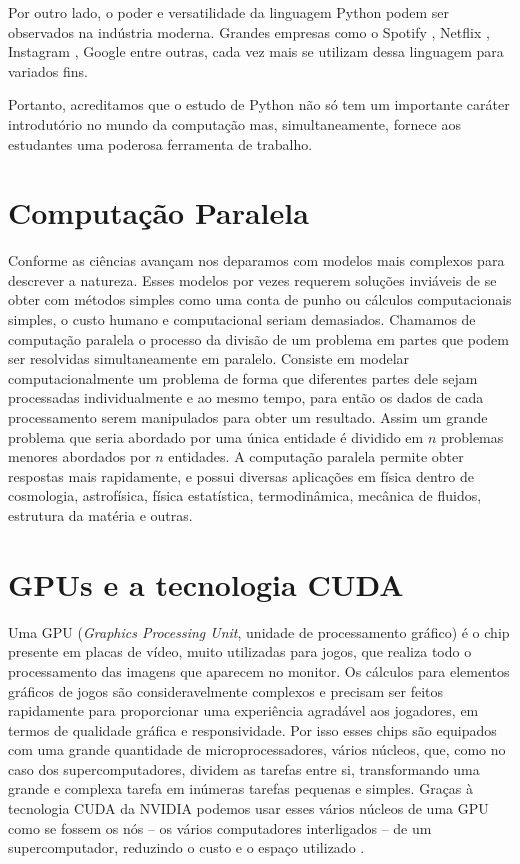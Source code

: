 \documentclass[
	12pt,				%
	a4paper,			%
	english,			%
	openright,				%
	brazil,				%
	oneside]{abntex2}
\begin{document}
Por outro lado, o poder e versatilidade da linguagem Python podem ser observados na indústria moderna. Grandes empresas como o Spotify \cite{Spotify}, Netflix  \cite{Netflix}, Instagram \cite{Instagram}, Google \cite{google} entre outras, cada vez mais se utilizam dessa linguagem para variados fins.

Portanto, acreditamos que o estudo de Python não só tem um importante caráter introdutório no mundo da computação mas, simultaneamente, fornece aos estudantes uma poderosa ferramenta de trabalho. 

\section{Computação Paralela}
 	Conforme as ciências avançam nos deparamos com modelos mais complexos para descrever a natureza. Esses modelos por vezes requerem soluções inviáveis de se obter com métodos simples como uma conta de punho ou cálculos computacionais simples, o custo humano e computacional seriam demasiados.
  	Chamamos de computação paralela o processo da divisão de um problema em partes que podem ser resolvidas simultaneamente em paralelo. Consiste em modelar computacionalmente um problema de forma que diferentes partes dele sejam processadas individualmente e ao mesmo tempo, para então os dados de cada processamento serem manipulados para obter um resultado. Assim um grande problema que seria abordado por uma única entidade é dividido em $n$ problemas menores abordados por $n$ entidades. A computação paralela permite obter respostas mais rapidamente, e possui diversas aplicações em física dentro de cosmologia, astrofísica, física estatística, termodinâmica, mecânica de fluidos, estrutura da matéria e outras.
  	
\section{GPUs e a tecnologia CUDA}

	Uma GPU (\textit{Graphics Processing Unit}, unidade de processamento gráfico) é o chip presente em placas de vídeo, muito utilizadas para jogos, que realiza todo o processamento das imagens que aparecem no monitor. Os cálculos para elementos gráficos de jogos são consideravelmente complexos e precisam ser feitos rapidamente para proporcionar uma experiência agradável aos jogadores, em termos de qualidade gráfica e responsividade. Por isso esses chips são equipados com uma grande quantidade de microprocessadores, vários núcleos, que, como no caso dos supercomputadores, dividem as tarefas entre si, transformando uma grande e complexa tarefa em inúmeras tarefas pequenas e simples\cite{belleman}. Graças à tecnologia CUDA da NVIDIA \cite{cuda} podemos usar esses vários núcleos de uma GPU como se fossem os nós – os vários computadores interligados – de um supercomputador, reduzindo o custo e o espaço utilizado \cite{belleman}.
\end{document}
